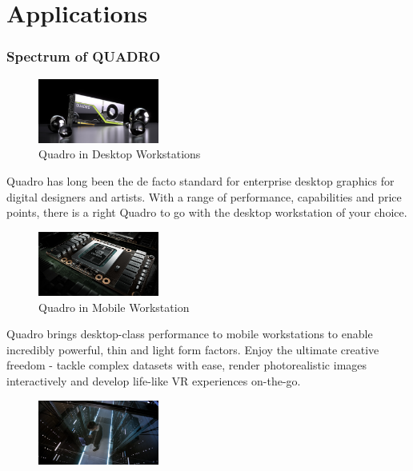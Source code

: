 \documentclass[xcolor=x11names,table]{beamer}
\begin{document}
\section{Applications}
    \begin{frame}[allowframebreaks]
    \frametitle{Spectrum of QUADRO}
        \begin{block}{
            \begin{figure}[H]
            	\includegraphics[width=150px]{refs/quadro-design-vis-quadro-rtx-8000-625-u@2x.jpg}
            	\caption{{\footnotesize Quadro in Desktop Workstations}}
            \end{figure}
            }
            {
            Quadro has long been the \gls{de facto standard} for enterprise desktop graphics for digital designers and artists. With a range of performance, capabilities and price points, there is a right Quadro to go with the desktop workstation of your choice.
            }
        \end{block}
        \begin{block}{
            \begin{figure}[H]
            	\includegraphics[width=150px]{refs/quadro-whats-new-feature-mobile-625-ud@2x.jpg}
            	\caption{{\footnotesize Quadro in Mobile Workstation}}
            \end{figure}
            }
            {
                Quadro brings desktop-class performance to mobile workstations to enable incredibly powerful, thin and light form factors. Enjoy the ultimate creative freedom - tackle complex datasets with ease, render photorealistic images interactively and develop life-like VR experiences on-the-go.
            }
        \end{block}
        \begin{block}{
            \begin{figure}[H]
            	\includegraphics[width=150px]{refs/design-vis-quadro-in-server-625-u@2x.jpg}

\end{figure}}
\end{block}
\end{frame}
\end{document}
